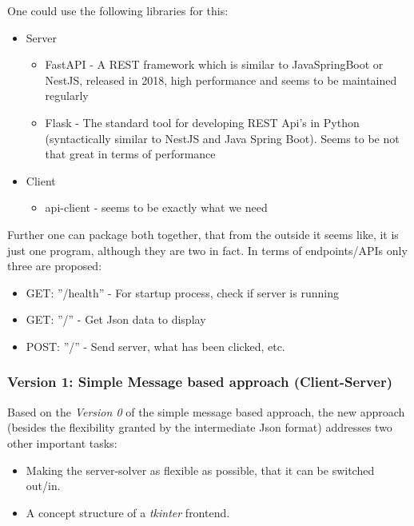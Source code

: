 \documentclass[12pt,a4paper]{article}
\newcommand{\<}[1]{\guilsinglleft}
\renewcommand{\>}[1]{\guilsinglright}
\begin{document}
\noindent One could use the following libraries for this:

\begin{itemize}
    \item Server
        \begin{itemize}
            \item FastAPI - A REST framework which is similar to JavaSpringBoot or NestJS, released in 2018, high performance and seems to be maintained regularly
            \item Flask - The standard tool for developing REST Api's in Python (syntactically similar to NestJS and Java Spring Boot). Seems to be not that great in terms of performance
        \end{itemize}
    \item Client
        \begin{itemize}
            \item api-client - seems to be exactly what we need 
        \end{itemize}
\end{itemize}

\noindent Further one can package both together, that from the outside it seems like, it is just one program, although they are two in fact. In terms of endpoints/APIs only three are proposed:

\begin{itemize}
    \item GET: ''/health'' - For startup process, check if server is running
    \item GET: ''/'' - Get Json data to display
    \item POST: ''/'' - Send server, what has been clicked, etc.
\end{itemize}

\newpage
\subsubsection{Version 1: Simple Message based approach (Client-Server)}

\noindent Based on the \textit{Version 0} of the simple message based approach, the new approach (besides the flexibility granted by the intermediate Json format) addresses two other important tasks:

\begin{itemize}
    \item Making the server-solver as flexible as possible, that it can be switched out/in.
    \item A concept structure of a \textit{tkinter} frontend.
\end{itemize}
\end{document}
